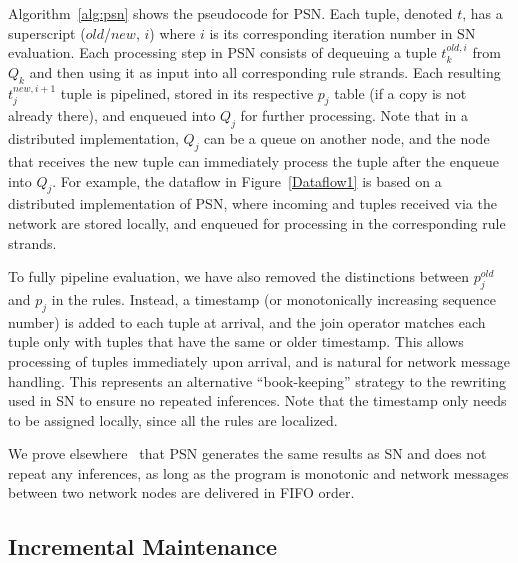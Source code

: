Algorithm~\ref{alg:psn} shows the pseudocode for PSN. Each tuple,
denoted $t$, has a superscript ($old$/$new$, $i$) where $i$ is its
corresponding iteration number in SN evaluation. Each processing step
in PSN consists of dequeuing a tuple $t^{old,i}_{k}$ from $Q_{k}$ and
then using it as input into all corresponding rule strands. Each
resulting $t^{new,i+1}_{j}$ tuple is pipelined, stored in its
respective $p_{j}$ table (if a copy is not already there), and
enqueued into $Q_{j}$ for further processing. Note that in a
distributed implementation, $Q_{j}$ can be a queue on another node,
and the node that receives the new tuple can immediately process the
tuple after the enqueue into $Q_{j}$. For example, the dataflow in
Figure~\ref{Dataflow1} is based on a distributed implementation of
PSN, where incoming  and  tuples received via the network
are stored locally, and enqueued for processing in the corresponding
rule strands.

To fully pipeline evaluation, we have also removed the distinctions
between $p^{old}_{j}$ and $p_{j}$ in the rules. Instead, a timestamp
(or monotonically increasing sequence number) is added to each tuple
at arrival, and the join operator matches each tuple only with tuples
that have the same or older timestamp. This allows processing of
tuples immediately upon arrival, and is natural for network message
handling. This represents an alternative ``book-keeping'' strategy to
the rewriting used in SN to ensure no repeated inferences. Note that
the timestamp only needs to be assigned locally, since all the rules
are localized.


We prove elsewhere~\cite{declareNetworks} that PSN generates the same
results as SN and does not repeat any inferences, as long as the \Dlog
program is monotonic and network messages between two network nodes are
delivered in FIFO order. 



\subsection{Incremental Maintenance}


